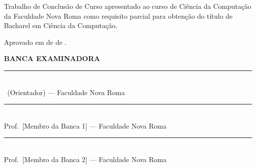 \begingroup
\singlespacing
\begin{center}
\vspace*{1.2cm}
{\bfseries \tccautor}

\vspace{1.0cm}
{\large\bfseries \tcctitulo}
\end{center}

\vspace{1.0cm}
\hspace*{7cm}\begin{minipage}{7.5cm}
\singlespacing\small
Trabalho de Conclusão de Curso apresentado ao curso de Ciência da Computação da
Faculdade Nova Roma como requisito parcial para obtenção do título de Bacharel em
Ciência da Computação.
\end{minipage}

\vspace{1.0cm}
\begin{center}Aprovado em \underline{\hspace{1cm}} de \underline{\hspace{3cm}} de \tccano.\end{center}

\vspace{1.5cm}
\begin{center}
{\bfseries BANCA EXAMINADORA}

\vspace{1.8cm}
\rule{9cm}{0.4pt}\\
\tccorientador\ (Orientador) --- Faculdade Nova Roma

\vspace{1.4cm}
\rule{9cm}{0.4pt}\\
Prof.\ [Membro da Banca 1] --- Faculdade Nova Roma

\vspace{1.4cm}
\rule{9cm}{0.4pt}\\
Prof.\ [Membro da Banca 2] --- Faculdade Nova Roma
\end{center}
\endgroup
\newpage
